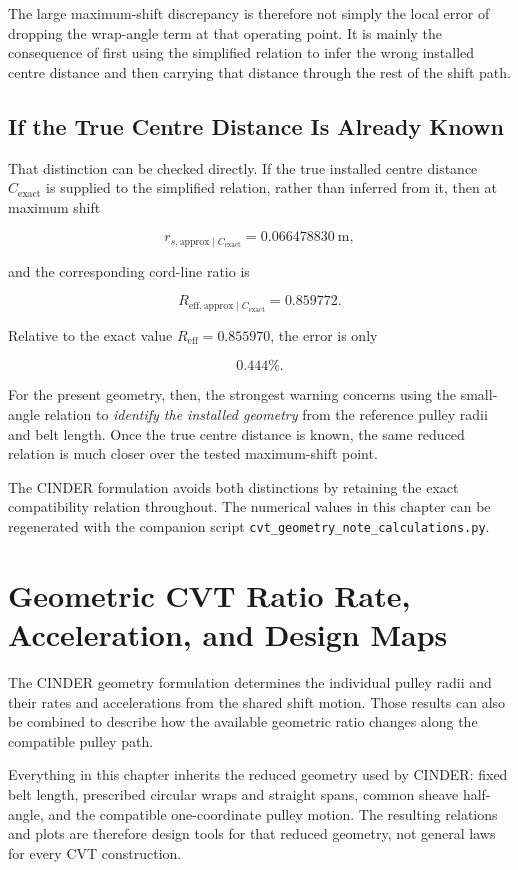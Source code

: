 \documentclass[11pt]{report}
\begin{document}
The large maximum-shift discrepancy is therefore not simply the local error of
dropping the wrap-angle term at that operating point. It is mainly the
consequence of first using the simplified relation to infer the wrong installed
centre distance and then carrying that distance through the rest of the shift
path.

\section{If the True Centre Distance Is Already Known}

That distinction can be checked directly. If the true installed centre
distance \(C_{\mathrm{exact}}\) is supplied to the simplified relation,
rather than inferred from it, then at maximum shift

\[
r_{s,\mathrm{approx}\mid C_{\mathrm{exact}}}
=
\SI{0.066478830}{\metre},
\]

and the corresponding cord-line ratio is

\[
R_{\mathrm{eff,approx}\mid C_{\mathrm{exact}}}
=
0.859772.
\]

Relative to the exact value \(R_{\mathrm{eff}}=0.855970\),
the error is only

\[
0.444\%.
\]

For the present geometry, then, the strongest warning concerns using the
small-angle relation to \emph{identify the installed geometry} from the
reference pulley radii and belt length. Once the true centre distance is known,
the same reduced relation is much closer over the tested maximum-shift point.

The CINDER formulation avoids both distinctions by retaining the exact
compatibility relation throughout. The numerical values in this chapter can be
regenerated with the companion script
\texttt{cvt\_geometry\_note\_calculations.py}.

\chapter{Geometric CVT Ratio Rate, Acceleration, and Design Maps}
\label{chap:ratio-geometry-note}

The CINDER geometry formulation determines the individual pulley radii and
their rates and accelerations from the shared shift motion. Those results can
also be combined to describe how the available geometric ratio changes along
the compatible pulley path.

Everything in this chapter inherits the reduced geometry used by CINDER:
fixed belt length, prescribed circular wraps and straight spans, common sheave
half-angle, and the compatible one-coordinate pulley motion. The resulting
relations and plots are therefore design tools for that reduced geometry, not
general laws for every CVT construction.
\end{document}

